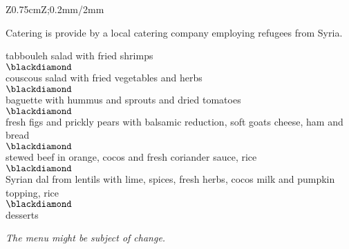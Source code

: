 \begin{landscape}
\begin{center}
\begin{tabular}{Z{0.75cm}Z{\socialEventBoxWidth};{0.2mm/2mm}}
\begin{minipage}[t]{\socialEventBoxWidth}
\begin{minipage}[t]{0.47\linewidth}
          \vspace{\baselineskip}
          Catering is provide by a local catering company employing refugees from Syria.
        \end{minipage}
        \hfill
        \noindent\begin{minipage}[t]{0.47\linewidth}
          \begin{center}
            \noindent tabbouleh salad with fried shrimps\\
            $\blackdiamond$\\
            couscous salad with fried vegetables and herbs\\
            $\blackdiamond$\\
            baguette with hummus and sprouts and dried tomatoes\\
            $\blackdiamond$\\
            fresh figs and prickly pears with balsamic reduction, soft goats cheese, ham and bread\\
            $\blackdiamond$\\
            stewed beef in orange, cocos and fresh coriander sauce, rice\\
            $\blackdiamond$\\
            Syrian dal from lentils with lime, spices, fresh herbs, cocos milk and pumpkin topping, rice\\
            $\blackdiamond$\\
            desserts

            \noindent \emph{The menu might be subject of change.}
          \end{center}
        \end{minipage}
      \end{minipage}
      \vspace{0.4\multicolsep}
      \tabularnewline
    \end{tabular}
  \end{center}
  \newpage
\end{landscape}
\renewcommand{\arraystretch}{1.0}
